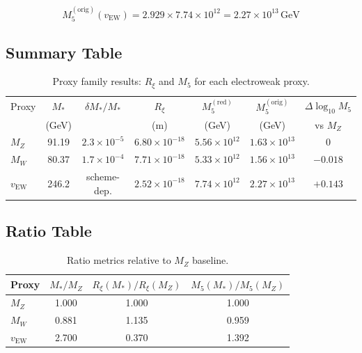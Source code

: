 \documentclass[11pt,a4paper]{article}
\newcommand{\Mfive}{M_5}
\newcommand{\Rxi}{R_\xi}
\newcommand{\MZ}{M_Z}
\newcommand{\MW}{M_W}
\newcommand{\vEW}{v_{\mathrm{EW}}}
\newcommand{\Mstar}{M_*}
\newcommand{\GeV}{\,\mathrm{GeV}}
\theoremstyle{definition}
\theoremstyle{plain}
\theoremstyle{remark}
\begin{document}
\begin{equation}
\Mfive^{\mathrm{(orig)}}(\vEW) = 2.929 \times 7.74 \times 10^{12} = 2.27 \times 10^{13}\GeV
\label{eq:M5-vEW-orig-result}
\end{equation}

\subsection{Summary Table}

\begin{table}[htbp]
\centering
\caption{Proxy family results: $\Rxi$ and $\Mfive$ for each electroweak proxy.}
\label{tab:proxy-results}
\begin{tabular}{@{}lcccccc@{}}
\toprule
Proxy & $\Mstar$ & $\delta\Mstar/\Mstar$ & $\Rxi$ & $\Mfive^{\mathrm{(red)}}$ & $\Mfive^{\mathrm{(orig)}}$ & $\Delta\log_{10}\Mfive$ \\
      & (GeV) & & (m) & (GeV) & (GeV) & vs $\MZ$ \\
\midrule
$\MZ$ & 91.19 & $2.3\times 10^{-5}$ & $6.80\times 10^{-18}$ & $5.56\times 10^{12}$ & $1.63\times 10^{13}$ & 0 \\
$\MW$ & 80.37 & $1.7\times 10^{-4}$ & $7.71\times 10^{-18}$ & $5.33\times 10^{12}$ & $1.56\times 10^{13}$ & $-0.018$ \\
$\vEW$ & 246.2 & scheme-dep. & $2.52\times 10^{-18}$ & $7.74\times 10^{12}$ & $2.27\times 10^{13}$ & $+0.143$ \\
\bottomrule
\end{tabular}
\end{table}

\subsection{Ratio Table}

\begin{table}[htbp]
\centering
\caption{Ratio metrics relative to $\MZ$ baseline.}
\label{tab:ratio-results}
\begin{tabular}{@{}lccc@{}}
\toprule
Proxy & $\Mstar/\MZ$ & $\Rxi(\Mstar)/\Rxi(\MZ)$ & $\Mfive(\Mstar)/\Mfive(\MZ)$ \\
\midrule
$\MZ$ & 1.000 & 1.000 & 1.000 \\
$\MW$ & 0.881 & 1.135 & 0.959 \\
$\vEW$ & 2.700 & 0.370 & 1.392 \\
\bottomrule
\end{tabular}
\end{table}
\end{document}
